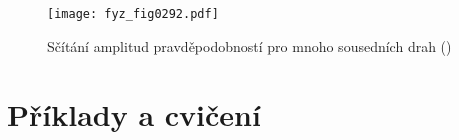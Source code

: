     \begin{figure}[ht!] %
      \centering
      \texttt{[image: fyz\_fig0292.pdf]}
      \caption{Sčítání amplitud pravděpodobností pro mnoho sousedních drah
               (\cite[s.~355]{Feynman01})}
      \label{fyz:fig0292}
    \end{figure}

  \section{Příklady a cvičení}\label{fyz:IchapXXVIsecVII}
  
